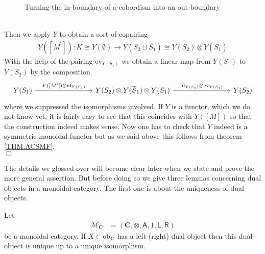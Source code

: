 \begin{prf}
\begin{figure}[h!]
\caption{Turning the in-boundary of a cobordism into an out-boundary}
\label{fig:cobto0in}
\end{figure}
\\
Then we apply $Y$ to obtain a sort of copairing
\begin{align*}
  Y([M^{\backprime}])
  \colon
  K
  \cong
  Y(\emptyset)
  \to
  Y(S_{2} \sqcup \overline{S}_{1}) \cong Y(S_{2})
  \otimes
  Y(\overline{S}_{1})
\end{align*}
With the help of the pairing $\mathrm{ev}_{Y(S_{1})}$ we obtain a linear map from $Y(S_{1})$ to $Y(S_{2})$ by the composition
\begin{equation*}
\begin{tikzcd}[row sep=3em,column sep=8em]
  Y(S_{1})
  \ar{r}{Y([M^{\backprime}]) \otimes \mathrm{id}_{Y(S_{1})}}
  &
  Y(S_{2}) \otimes Y(\overline{S}_{1}) \otimes Y(S_{1})
  \ar{r}{\mathrm{id}_{Y(S_{2})} \otimes \mathrm{ev}_{Y(S_{1})}}
  &
  Y(S_{2})
\end{tikzcd}
\end{equation*}
where we suppressed the isomorphisms involved. If $Y$ is a functor, which we do not know yet, it is fairly easy to see that this coincides with $Y([M])$ so that the construction indeed makes sense. Now one has to check that $Y$ indeed is a symmetric monoidal functor but as we said above this follows from theorem \ref{THM:ACSMF}.
\\
\phantom{proven}
\hfill
$\Box$
\end{prf}
The details we glossed over will become clear later when we state and prove the more general assertion. But before doing so we give three lemmas concerning dual objects in a monoidal category. The first one is about the uniqueness of dual objects.
\\
\begin{lem}
\label{lem:dualunique}
Let
\begin{align*}
  \mathcal{M}_{\mathbf{C}}
  &=
  \left(
    \mathbf{C}
    ,
    \otimes
    ,
    \mathsf{A}
    ,
    1
    ,
    \mathsf{L}
    ,
    \mathsf{R}
  \right)
\end{align*}
be a monoidal category. If $X \in \mathrm{ob}_{\mathbf{C}}$ has a left (right) dual object then this dual object is unique up to a unique isomorphism.
\end{lem}
